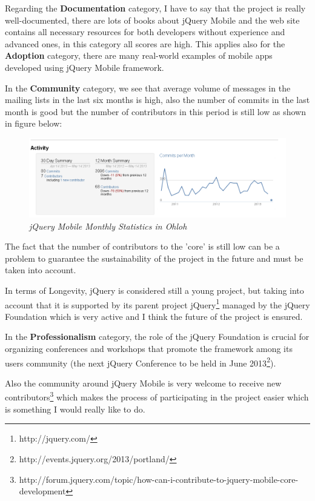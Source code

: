 \documentclass[a4paper,12pt]{book}
\begin{document}
Regarding the \textbf{Documentation} category, I have to say that the project is really well-documented, there are lots of books about jQuery Mobile and the web site contains all necessary resources for both developers without experience and advanced ones, in this category all scores are high. This applies also for the \textbf{Adoption} category, there are many real-world examples of mobile apps developed using jQuery Mobile framework.

In the \textbf{Community} category, we see that average volume of messages in the mailing lists in the last six months is high, also the number of commits in the last month is good but the number of contributors in this period is still low as shown in figure below:

\begin{figure}[H]
    \centering
    \includegraphics[width=15cm, keepaspectratio]{img/jqueryohloh.png}
    \caption{\textit{jQuery Mobile Monthly Statistics in Ohloh}}
    \label{figure:jquerymonthly}
 \end{figure}
 
The fact that the number of contributors to the 'core' is still low can be a problem to guarantee the sustainability of the project in the future and must be taken into account.

In terms of Longevity, jQuery is considered still a young project, but taking into account that it is supported by its parent project jQuery\footnote{http://jquery.com/}  managed by the jQuery Foundation\cite{jQuery Foundation} which is very active and I think the future of the project is ensured.

In the \textbf{Professionalism} category, the role of the jQuery Foundation is crucial for organizing conferences and workshops that promote the framework among its users community (the next jQuery Conference to be held in June 2013\footnote{http://events.jquery.org/2013/portland/}).

Also the community around jQuery Mobile is very welcome to receive new contributors\footnote{http://forum.jquery.com/topic/how-can-i-contribute-to-jquery-mobile-core-development} which makes the process of participating in the project easier which is something I would really like to do.
\end{document}
